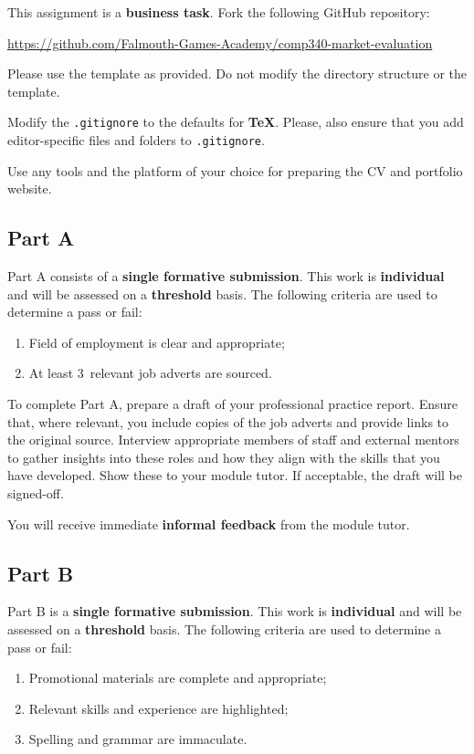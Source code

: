 \documentclass{../../fal_assignment}
\newcommand{\minReferenceCount}{3}
\begin{document}
This assignment is a \textbf{business task}. Fork the following GitHub repository:

\indent \url{https://github.com/Falmouth-Games-Academy/comp340-market-evaluation}

Please use the template as provided. Do not modify the directory structure or the template.

Modify the \texttt{.gitignore} to the defaults for \textbf{TeX}. Please, also ensure that you add editor-specific files and folders to \texttt{.gitignore}. 

Use any tools and the platform of your choice for preparing the CV and portfolio website.

\subsection*{Part A}

Part A consists of a \textbf{single formative submission}. This work is \textbf{individual} and will be assessed on a \textbf{threshold} basis. The following criteria are used to determine a pass or fail:

\begin{enumerate}[label=(\alph*)]
	\item Field of employment is clear and appropriate;
	\item At least \minReferenceCount ~relevant job adverts are sourced.
\end{enumerate}

To complete Part A, prepare a draft of your professional practice report. Ensure that, where relevant, you include copies of the job adverts and provide links to the original source.  Interview appropriate members of staff and external mentors to gather insights into these roles and how they align with the skills that you have developed. Show these to your module tutor.  If acceptable, the draft will be signed-off. 

You will receive immediate \textbf{informal feedback} from the module tutor.

\subsection*{Part B}

Part B is a \textbf{single formative submission}. This work is \textbf{individual} and will be assessed on a \textbf{threshold} basis. The following criteria are used to determine a pass or fail:

\begin{enumerate}[label=(\alph*)]
	\item Promotional materials are complete and appropriate;
	\item Relevant skills and experience are highlighted;
	\item Spelling and grammar are immaculate.
\end{enumerate}
\end{document}
